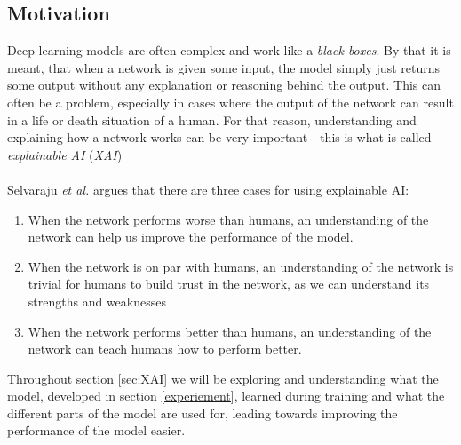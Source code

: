 \documentclass[./main.tex]{subfiles}
\begin{document}
\subsection{Motivation}\label{subsec:motivation_xai}
Deep learning models are often complex and work like a \textit{black boxes}. By that it is meant, that when a network is given some input, the model simply just returns some output without any explanation or reasoning behind the output. This can often be a problem, especially in cases where the output of the network can result in a life or death situation of a human. For that reason, understanding and explaining how a network works can be very important - this is what is called \textit{explainable AI} (\textit{XAI}) 
\\
\\
Selvaraju \textit{et al.} \cite{Selvaraju} argues that there are three cases for using explainable AI:
\begin{enumerate}
    \item When the network performs worse than humans, an understanding of the network can help us improve the performance of the model.
    \item When the network is on par with humans, an understanding of the network is trivial for humans to build trust in the network, as we can understand its strengths and weaknesses
    \item When the network performs better than humans, an understanding of the network can teach humans how to perform better.
\end{enumerate}
Throughout section \ref{sec:XAI} we will be exploring and understanding what the model, developed in section \ref{experiement}, learned during training and what the different parts of the model are used for, leading towards improving the performance of the model easier.
\end{document}

